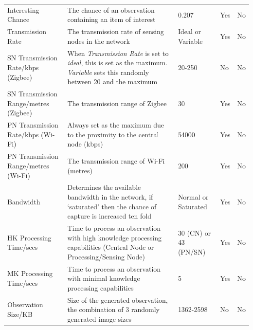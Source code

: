 \begin{landscape}
\begin{table}
\begin{tabularx}{\textwidth}{|p{4cm}|p{10cm}|p{3cm}|p{2cm}|p{2cm}|}
	Interesting Chance                      & The chance of an observation containing an item of interest                                                                 & 0.207               & Yes                & No                 \\
	Transmission Rate                       & The transmission rate of sensing nodes in the network                                                                      & Ideal or Variable   & Yes                & No                 \\
	SN Transmission Rate/kbps (Zigbee) & When \textit{Transmission Rate} is set to \textit{ideal}, this is set as the maximum. \textit{Variable} sets this randomly between 20 and the maximum & 20-250          & No                 & No                 \\
	SN Transmission Range/metres (Zigbee)& The transmission range of Zigbee                                                                                  & 30                  & Yes                & No                 \\
	PN Transmission Rate/kbps (Wi-Fi)  & Always set as the maximum due to the proximity to the central node (kbps)                                                         & 54000           & Yes                & No                 \\
	PN Transmission Range/metres (Wi-Fi) & The transmission range of Wi-Fi (metres)                                                                                            & 200                 & Yes                & No                 \\
	Bandwidth                               & Determines the available bandwidth in the network, if `saturated' then the chance of capture is increased ten fold          & Normal or Saturated & Yes                & No                 \\
	HK Processing Time/secs                     & Time to process an observation with high knowledge processing capabilities (Central Node or Processing/Sensing Node)           & 30 (CN) or 43 (PN/SN)            & Yes                & No                 \\
	MK Processing Time/secs                      & Time to process an observation with minimal knowledge processing capabilities                                               & 5                   & Yes                & No                 \\
	Observation Size/KB                       & Size of the generated observation, the combination of 3 randomly generated image sizes                                      & 1362-2598        & No                 & No                 \\

\end{tabularx}
\end{table}
\end{landscape}

